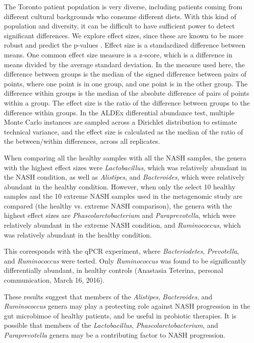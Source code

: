 The Toronto patient population is very diverse, including patients coming from different cultural backgrounds who consume different diets. With this kind of population and diversity, it can be difficult to have sufficient power to detect significant differences. We explore effect sizes, since these are known to be more robust and predict the p-values \cite{halsey2015fickle}. Effect size is a standardized difference between means. One common effect size measure is a z-score, which is a difference in means divided by the average standard deviation. In the measure used here, the difference between groups is the median of the signed difference between pairs of points, where one point is in one group, and one point is in the other group. The difference within groups is the median of the absolute difference of pairs of points within a group. The effect size is the ratio of the difference between groups to the difference within groups. In the ALDEx differential abundance test, multiple Monte Carlo instances are sampled across a Dirichlet distribution to estimate technical variance, and the effect size is calculated as the median of the ratio of the between/within differences, across all replicates.

When comparing all the healthy samples with all the NASH samples, the genera with the highest effect sizes were \textit{Lactobacillus}, which was relatively abundant in the NASH condition, as well as \textit{Alistipes}, and \textit{Bacteroides}, which were relatively abundant in the healthy condition. However, when only the select 10 healthy samples and the 10 extreme NASH samples used in the metagenomic study are compared (the healthy vs. extreme NASH comparison), the genera with the highest effect sizes are \textit{Phascolarctobacterium} and \textit{Paraprevotella}, which were relatively abundant in the extreme NASH condition, and \textit{Ruminococcus}, which was relatively abundant in the healthy condition.

This corresponds with the qPCR experiment, where \textit{Bacteriodetes}, \textit{Prevotella}, and \textit{Ruminococcus} were tested. Only \textit{Ruminococcus} was found to be significantly differentially abundant, in healthy controls (Anastasia Teterina, personal communication, March 16, 2016).

These results suggest that members of the \textit{Alistipes}, \textit{Bacteroides}, and \textit{Ruminococcus} genera may play a protecting role against NASH progression in the gut microbimoe of healthy patients, and be useful in probiotic therapies. It is possible that members of the \textit{Lactobacillus}, \textit{Phascolarctobacterium}, and \textit{Paraprevotella} genera may be a contributing factor to NASH progression.

